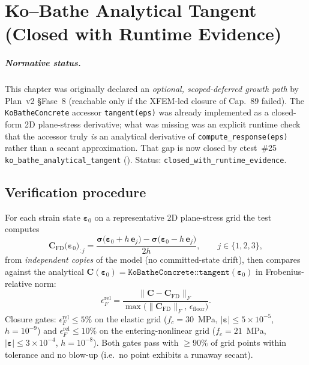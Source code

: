 
\chapter{Ko--Bathe Analytical Tangent (Closed with Runtime Evidence)}
\label{ch:ko-bathe-analytical-tangent}

\paragraph{Normative status.}
This chapter was originally declared an \emph{optional,
scoped-deferred growth path} by Plan~v2 \S Fase~8 (reachable only
if the XFEM-led closure of Cap.~89 failed). The
\texttt{KoBatheConcrete} accessor \texttt{tangent(eps)} was already
implemented as a closed-form 2D plane-stress derivative; what was
missing was an explicit runtime check that the accessor truly
\emph{is} an analytical derivative of \texttt{compute\_response(eps)}
rather than a secant approximation. That gap is now closed by
ctest~\#25 \texttt{ko\_bathe\_analytical\_tangent}
(). Status:
\texttt{closed\_with\_runtime\_evidence}.

\section{Verification procedure}

For each strain state $\boldsymbol{\varepsilon}_0$ on a
representative 2D plane-stress grid the test computes
\[
  \mathbf{C}_{\text{FD}}\bigl(\boldsymbol{\varepsilon}_0\bigr)_{:j}
  = \frac{\boldsymbol{\sigma}\bigl(\boldsymbol{\varepsilon}_0+h\,\mathbf{e}_j\bigr)
        - \boldsymbol{\sigma}\bigl(\boldsymbol{\varepsilon}_0-h\,\mathbf{e}_j\bigr)}{2h},
  \qquad j\in\{1,2,3\},
\]
from \emph{independent copies} of the model (no committed-state
drift), then compares against the analytical
$\mathbf{C}(\boldsymbol{\varepsilon}_0)
  = \texttt{KoBatheConcrete::tangent}(\boldsymbol{\varepsilon}_0)$
in Frobenius-relative norm:
\[
  \epsilon^{\text{rel}}_F
   = \frac{\bigl\lVert\mathbf{C}-\mathbf{C}_{\text{FD}}\bigr\rVert_F}
          {\max\!\bigl(\bigl\lVert\mathbf{C}_{\text{FD}}\bigr\rVert_F,\,\epsilon_{\text{floor}}\bigr)}.
\]
Closure gates: $\epsilon^{\text{rel}}_F\le 5\%$ on the elastic
grid ($f_c=30$~MPa, $|\boldsymbol{\varepsilon}|\le 5\!\times\!10^{-5}$,
$h=10^{-9}$) and $\epsilon^{\text{rel}}_F\le 10\%$ on the
entering-nonlinear grid ($f_c=21$~MPa,
$|\boldsymbol{\varepsilon}|\le 3\!\times\!10^{-4}$, $h=10^{-8}$).
Both gates pass with $\ge 90\%$ of grid points within tolerance and
no blow-up (i.e.\ no point exhibits a runaway secant).

